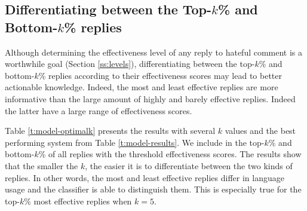 \documentclass[11pt]{article}
\begin{document}
\subsection{Differentiating between the Top-$k$\% and Bottom-$k$\% replies}
\label{ss:topbottom}
Although determining the effectiveness level of any reply to hateful comment is a worthwhile goal (Section \ref{ss:levels}),
differentiating between the top-$k$\% and bottom-$k$\% replies according to their effectiveness scores may lead to better actionable knowledge.
Indeed, the most and least effective replies are more informative than the large amount of highly and barely effective replies.
Indeed the latter have a large range of effectiveness scores.

Table \ref{t:model-optimalk} presents the results with several $k$ values and the best performing system from Table \ref{t:model-results}.
We include in the top-$k$\% and bottom-$k$\% of all replies with the threshold effectiveness scores.
The results show that the smaller the $k$, the easier it is to differentiate between the two kinds of replies.
In other words, the most and least effective replies differ in language usage and the classifier is able to distinguish them.
This is especially true for the top-$k$\% most effective replies when $k=5$.



\end{document}
